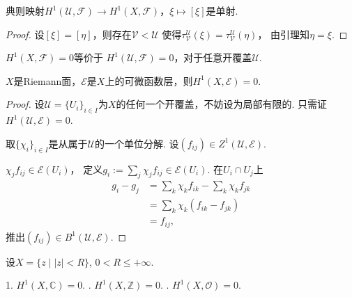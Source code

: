 \begin{proposition}
	典则映射$H^1(\mathscr{U},\mathscr{F})\rightarrow H^1(X, \mathscr{F})$，$\xi \mapsto [\xi]$是单射.
\end{proposition}
		
\begin{proof}
	设$[\xi]=[\eta]$，则存在$\mathscr{V}<\mathscr{U}$
    使得$\tau^\mathscr{U}_\mathscr{V}(\xi)=\tau^\mathscr{U}_\mathscr{V}(\eta)$，
    由引理知$\eta=\xi$.
\end{proof}
		
\begin{proposition}
	$H^1(X,\mathscr{F})=0$等价于
    $H^1(\mathscr{U},\mathscr{F})=0$，对于任意开覆盖$\mathscr{U}$.
\end{proposition}
		
\begin{theorem}
	$X$是Riemann面，$\mathcal{E}$是$X$上的可微函数层，则$H^1(X,\mathcal{E})=0$.
\end{theorem}
		
\begin{proof}
	设$\mathscr{U}=\{U_i\}_{i\in I}$为$X$的任何一个开覆盖，不妨设为局部有限的. 
    只需证$H^1(\mathscr{U}, \mathcal{E})=0$.

	取$\{\chi_i\}_{i\in I}$是从属于$\mathscr{U}$的一个单位分解. 
    设$(f_{ij})\in Z^1(\mathscr{U},\mathcal{E})$.

	$\chi_j f_{ij}\in \mathcal{E}(U_i)$，
    定义$g_i:=\sum\limits_{j} \chi_jf_{ij}\in \mathcal{E}(U_i)$. 
    在$U_i\cap U_j$上
	\begin{align*}
		g_i-g_j&=\sum_k \chi_kf_{ik}-\sum_k \chi_kf_{jk}\\
		&=\sum_k \chi_k(f_{ik}-f_{jk})\\
		&=f_{ij},
	\end{align*}
    推出$(f_{ij})\in B^1(\mathscr{U}, \mathcal{E})$.
\end{proof}

\begin{theorem}
	设$X=\{z\mid |z|<R\}$, $0<R\leq +\infty$.\par
	1. $H^1(X,\mathbb{C})=0$. . $H^1(X,\mathbb{Z})=0$. . $H^1(X, \mathcal{O})=0$.
\end{theorem}

